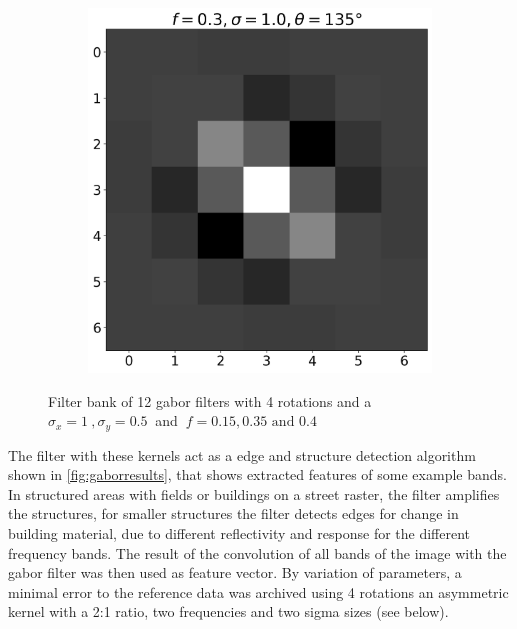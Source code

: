\documentclass[12pt,a4paper, english,twoside]{scrartcl}
\begin{document}
\begin{figure}[!htbp]
\begin{subfigure}[b]{0.3\textwidth}
      \end{subfigure}
      \begin{subfigure}[b]{0.3\textwidth}
        \includegraphics[width=\textwidth]{img/K11.png}
      \end{subfigure}
      \caption{Filter bank of 12 gabor filters with 4 rotations and a $\sigma_x=1\ ,\sigma_y = 0.5\ $ and $\ f = 0.15, 0.35 \text{ and } 0.4$\label{fig:gaborbank}}%
    \end{figure}
    \noindent
    The filter with these kernels act as a edge and structure detection algorithm shown in \cref{fig:gaborresults}, that shows extracted features of some example bands.
    In structured areas with fields or buildings on a street raster, the filter amplifies the structures, for smaller structures the filter detects edges for change in building material, due to different reflectivity and response for the different frequency bands. 
    \noindent 
      The result of the convolution of all bands of the image with the gabor filter was then used as feature vector. 
      By variation of parameters, a minimal error to the reference data was archived using 4 rotations an asymmetric kernel with a 2:1 ratio, two frequencies and two sigma sizes (see below).
\end{document}
